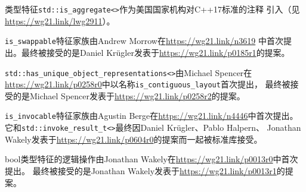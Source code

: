 类型特征\texttt{std::is\_aggregate<>}作为美国国家机构对C++17标准的注释
引入（见\url{https://wg21.link/lwg2911}）。

\texttt{is\_swappable}特征家族由Andrew Morrow在\url{https://wg21.link/n3619}
中首次提出。最终被接受的是Daniel Krügler发表于\url{https://wg21.link/p0185r1}的提案。

\texttt{std::has\_unique\_object\_representations<>}由Michael Spencer在
\url{https://wg21.link/p0258r0}中以名称\texttt{is\_contiguous\_layout}首次提出，
最终被接受的是Michael Spencer发表于\url{https://wg21.link/p0258r2}的提案。

\texttt{is\_invocable}特征家族由Agustin Berge在\url{https://wg21.link/n4446}中首次提出。\\
它和\texttt{std::invoke\_result\_t<>}最终因Daniel Krügler、Pablo Halpern、
Jonathan Wakely发表于\url{https://wg21.link/p0604r0}的提案而一起被标准库接受。

bool类型特征的逻辑操作由Jonathan Wakely在\url{https://wg21.link/p0013r0}中首次提出。
最终被接受的是Jonathan Wakely发表于\url{https://wg21.link/p0013r1}的提案。